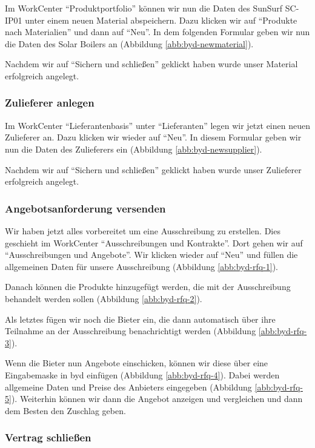 Im WorkCenter "`Produktportfolio"' können wir nun die Daten des SunSurf SC-IP01 unter einem neuen Material abspeichern. Dazu klicken wir auf "`Produkte nach Materialien"' und dann auf "`Neu"'. In dem folgenden Formular geben wir nun die Daten des Solar Boilers an (Abbildung \ref{abb:byd-newmaterial}).

Nachdem wir auf "`Sichern und schließen"' geklickt haben wurde unser Material erfolgreich angelegt.

\subsubsection{Zulieferer anlegen}

Im WorkCenter "`Lieferantenbasis"' unter "`Lieferanten"' legen wir jetzt einen neuen Zulieferer an. Dazu klicken wir wieder auf "`Neu"'. In diesem Formular geben wir nun die Daten des Zulieferers ein (Abbildung \ref{abb:byd-newsupplier}).

Nachdem wir auf "`Sichern und schließen"' geklickt haben wurde unser Zulieferer erfolgreich angelegt.

\subsubsection{Angebotsanforderung versenden}

Wir haben jetzt alles vorbereitet um eine Ausschreibung zu erstellen. Dies geschieht im WorkCenter "`Ausschreibungen und Kontrakte"'. Dort gehen wir auf "`Ausschreibungen und Angebote"'. Wir klicken wieder auf "`Neu"' und füllen die allgemeinen Daten für unsere Ausschreibung (Abbildung \ref{abb:byd-rfq-1}). 

Danach können die Produkte hinzugefügt werden, die mit der Ausschreibung behandelt werden sollen (Abbildung \ref{abb:byd-rfq-2}).

Als letztes fügen wir noch die Bieter ein, die dann automatisch über ihre Teilnahme an der Ausschreibung benachrichtigt werden (Abbildung \ref{abb:byd-rfq-3}).

Wenn die Bieter nun Angebote einschicken, können wir diese über eine Eingabemaske in \gls{byd} einfügen (Abbildung \ref{abb:byd-rfq-4}). Dabei werden allgemeine Daten und Preise des Anbieters eingegeben (Abbildung \ref{abb:byd-rfq-5}). Weiterhin können wir dann die Angebot anzeigen und vergleichen und dann dem Besten den Zuschlag geben.

\subsubsection{Vertrag schließen}

